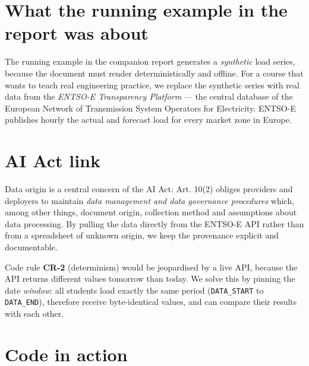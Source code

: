 \documentclass[
  english,
  letterpaper,
]{scrbook}
\begin{document}
\section{What the running example in the report was
about}\label{what-the-running-example-in-the-report-was-about}

The running example in the companion report generates a \emph{synthetic}
load series, because the document must render deterministically and
offline. For a course that wants to teach real engineering practice, we
replace the synthetic series with real data from the \emph{ENTSO-E
Transparency Platform} --- the central database of the European Network
of Transmission System Operators for Electricity. ENTSO-E publishes
hourly the actual and forecast load for every market zone in Europe.

\section{AI Act link}\label{ai-act-link}

Data origin is a central concern of the AI Act: Art. 10(2) obliges
providers and deployers to maintain \emph{data management and data
governance procedures} which, among other things, document origin,
collection method and assumptions about data processing. By pulling the
data directly from the ENTSO-E API rather than from a spreadsheet of
unknown origin, we keep the provenance explicit and documentable.

Code rule \textbf{CR-2} (determinism) would be jeopardised by a live
API, because the API returns different values tomorrow than today. We
solve this by pinning the date \emph{window}: all students load exactly
the same period (\texttt{DATA\_START} to \texttt{DATA\_END}), therefore
receive byte-identical values, and can compare their results with each
other.

\section{Code in action}\label{code-in-action-1}
\end{document}
